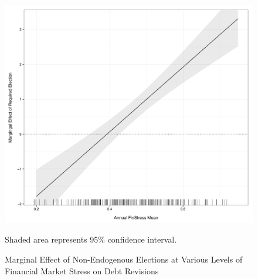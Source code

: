 \documentclass[]{article}
\begin{document}
\begin{figure}
    \caption{Marginal Effect of Non-Endogenous Elections at Various Levels of Financial Market Stress on Debt Revisions}
    \label{me_finstress_required_elect}

    \begin{center}
        \includegraphics[scale=0.4]{figures/finstress_required_elect_me.pdf}
    \end{center}

	{\scriptsize{Shaded area represents 95\% confidence interval.}}

\end{figure}
\end{document}
